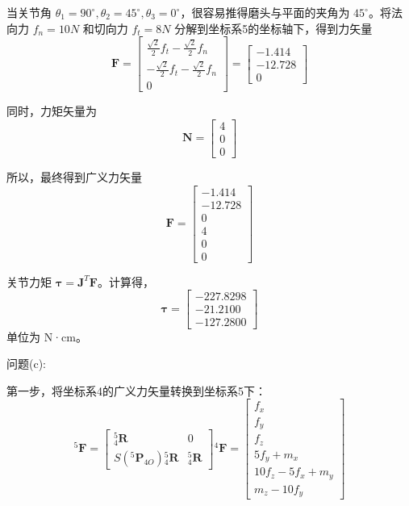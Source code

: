 \documentclass{homework}
\begin{document}
\begin{sol}
当关节角 $ \theta_1 = 90^\circ, \theta_2 = 45^\circ, \theta_3 = 0^\circ $，很容易推得磨头与平面的夹角为 $ 45^\circ $。将法向力 $ f_n = 10N $ 和切向力 $ f_t = 8N $ 分解到坐标系{5}的坐标轴下，得到力矢量
\[
  \mathbf{F} =
  \begin{bmatrix}
    \frac{\sqrt{2}}{2} f_t - \frac{\sqrt{2}}{2} f_n  \\
    -\frac{\sqrt{2}}{2} f_t - \frac{\sqrt{2}}{2} f_n \\
    0
  \end{bmatrix} =
  \begin{bmatrix}
    -1.414 \\
    -12.728 \\
    0
  \end{bmatrix}
\]

同时，力矩矢量为
\[
  \mathbf{N} =
  \begin{bmatrix}
    4 \\
    0 \\
    0
  \end{bmatrix}
\]

所以，最终得到广义力矢量
\[
  \mathbf{F} =
  \begin{bmatrix}
    -1.414 \\
    -12.728 \\
    0 \\
    4 \\
    0 \\
    0
  \end{bmatrix}
\]

关节力矩 $ \boldsymbol{\tau} = \mathbf{J}^T \mathbf{F} $。计算得，
\[
  \boldsymbol{\tau} =
  \begin{bmatrix}
    -227.8298 \\
    -21.2100 \\
    -127.2800
  \end{bmatrix}
\]
单位为 N·cm。

问题(c):

第一步，将坐标系{4}的广义力矢量转换到坐标系{5}下：
\[
  {^5}\mathbf{F} =
  \begin{bmatrix}
    {^5_4}\mathbf{R} & 0 \\
    S({^5}\mathbf{P}_{4O}) {^5_4}\mathbf{R} & {^5_4}\mathbf{R}
  \end{bmatrix}
  {^4}\mathbf{F} =
  \begin{bmatrix}
    f_x \\
    f_y \\
    f_z \\
    5 f_y + m_x \\
    10 f_z - 5 f_x + m_y \\
    m_z - 10 f_y
  \end{bmatrix}
\]


\end{sol}
\end{document}
